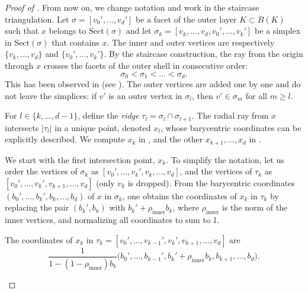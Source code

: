 \documentclass[a4paper,english,cleveref,autoref,thm-restate,nolineno]{socg-lipics-v2021}
\newcommand{\geomreal}[1] { |#1| } %
\newcommand{\sect}[1] { \mathrm{Sect}(#1) } %
\begin{document}
\begin{proof}[Proof of ]
	
	From now on, we change notation and work in the staircase triangulation.	
	Let $\sigma=[v_0',\dots,v_d']$ be a facet of the outer layer $K\subset B(K)$ such that $x$ belongs to $\sect{\sigma}$ and let $\sigma_k = [v_k,\dots,v_d,v_0',\dots,v_k']$ be a simplex in $\sect{\sigma}$ that contains $x$.
	The inner and outer vertices are respectively $\{v_k,\dots,v_d\}$ and $\{v_0',\dots,v_k'\}$.
	By the staircase construction, the ray from the origin through $x$ crosses the facets of the outer shell in consecutive order:
	\[
	\sigma_0<\sigma_1<\dots<\sigma_d.
	\]
	This has been observed in  (see  ).
	The outer vertices are added one by one and do not leave the simplices: if $v'$ is an outer vertex in $\sigma_l$, then $v'\in\sigma_m$ for all $m\geq l$.
	
	For $l\in\{k,\dots,d-1\}$, define the \textit{ridge} $\tau_l=\sigma_l\cap\sigma_{l+1}$.
	The radial ray from $x$ intersects $\geomreal{\tau_l}$ in a unique point, denoted $x_l$, whose barycentric coordinates can be explicitly described.
	We compute $x_k$ in , and the other $x_{k+1},\dots,x_d$ in .
	
	We start with the first intersection point, $x_k$.
	To simplify the notation, let us order the vertices of $\sigma_k$ as $ [v_0',\dots,v_k',v_k,\dots,v_d]$, and the vertices of $\tau_k$ as $ [v_0',\dots,v_k',v_{k+1},\dots,v_d]$ (only $v_k$ is dropped).
	From the barycentric coordinates $(b_0',\dots,b_k',b_k,\dots,b_d)$ of $x$ in $\sigma_k$, one obtains the coordinates of $x_k$ in $\tau_k$ by replacing the pair $(b_k',b_k)$ with $b_k'+\rho_{\mathrm{inner}}b_k$, where $\rho_{\mathrm{inner}}$ is the norm of the inner vertices, and normalizing all coordinates to sum to 1.
	
	\begin{claim}\label{claim:coordinates_quotient_first}
		The coordinates of $x_k$ in $\tau_k=[v_0',\dots,v_{k-1}',v_k',v_{k+1},\dots,v_d]$ are 
		\[
		\frac{1}{1-(1-\rho_{\mathrm{inner}})b_k}\big(b_0',\dots,b_{k-1}',b_k'+\rho_{\mathrm{inner}}b_k,b_{k+1},\dots,b_d\big).
		\]
	\end{claim}
	

\end{proof}
\end{document}
